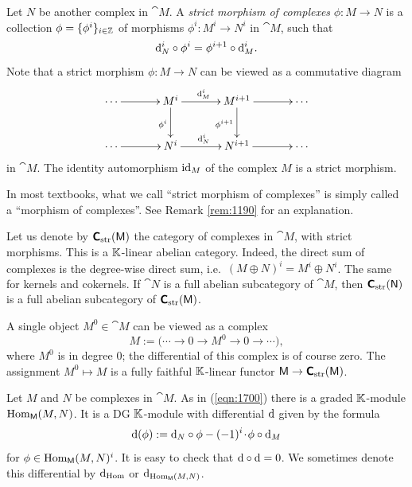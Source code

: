 Let $N$ be another complex in $\cat{M}$. A {\em strict morphism of complexes} 
$\phi : M \to N$ is a collection 
$\phi = \{ \phi^i \}_{i \in \mathbb{Z}}$ of morphisms $\phi^i : M^i \to N^i$ in
$\cat{M}$, such that
\begin{equation} \label{eqn:1254}
\mathrm{d}^i_N \circ \phi^i = \phi^{i+1} \circ \mathrm{d}^i_M .
\end{equation}
Note that a strict morphism $\phi : M \to N$ can be viewed as a commutative 
diagram 
\[ \UseTips  \xymatrix @C=8ex @R=6ex {
\cdots 
\ar[r]
&
M^i
\ar[r]^{\d_M^i}
\ar[d]_{\phi^i}
&
M^{i+1}
\ar[r]
\ar[d]_{\phi^{i+1}}
&
\cdots
\\
\cdots 
\ar[r]
&
N^i
\ar[r]^{\d_N^i}
&
N^{i+1}
\ar[r]
&
\cdots
} \]
in $\cat{M}$. 
The identity automorphism $\operatorname{id}_M$ of the complex $M$ is a strict 
morphism.  

\begin{rem} \label{rem:1210}
In most textbooks, what we call ``strict morphism of complexes'' is simply 
called a ``morphism of complexes''. See Remark \ref{rem:1190} for an 
explanation. 
\end{rem}

Let us denote by 
$\boldsymbol{\mathsf{C}}_{\mathrm{str}}(\operatorname{\mathsf{M}})$%
the category of complexes in 
$\cat{M}$, with strict morphisms. This is a $\mathbb{K}$-linear abelian category. 
Indeed, the direct sum of complexes is the degree-wise direct sum, i.e.\ 
$(M \oplus N)^i = M^i \oplus N^i$.
The same for kernels and cokernels.
If  $\cat{N}$ is a full abelian subcategory of $\cat{M}$, then  
$\boldsymbol{\mathsf{C}}_{\mathrm{str}}(\operatorname{\mathsf{N}})$ is a full abelian subcategory of 
$\boldsymbol{\mathsf{C}}_{\mathrm{str}}(\operatorname{\mathsf{M}})$.

A single object $M^0 \in \cat{M}$ can be viewed as a complex 
\[ M :=  \bigl( \cdots \to 0 \to M^0 \to 0 \to \cdots \bigr) , \] 
where $M^0$ is in degree $0$; the differential of this complex is of course 
zero. The assignment $M^0 \mapsto M$ is a fully faithful $\mathbb{K}$-linear functor 
$\operatorname{\mathsf{M}} \to \boldsymbol{\mathsf{C}}_{\mathrm{str}}(\operatorname{\mathsf{M}})$.

Let $M$ and $N$ be complexes in $\cat{M}$. As in (\ref{eqn:1700}) there is a 
graded $\mathbb{K}$-module $\operatorname{Hom}_{\operatorname{\mathsf{M}}}(M, N)$. It is a DG $\mathbb{K}$-module with 
differential $\mathrm{d}$ given by the formula 
\begin{equation} \label{eqn:1130}
\mathrm{d}(\phi) := \mathrm{d}_N \circ \phi - (-1)^i \mspace{1.5mu}{\cdot}\mspace{1.5mu} \phi \circ \mathrm{d}_M 
\end{equation}
for $\phi \in \operatorname{Hom}_{\operatorname{\mathsf{M}}}(M, N)^i$. 
It is easy to check that $\mathrm{d} \circ \mathrm{d} = 0$. 
We sometimes denote this differential by
$\mathrm{d}_{\operatorname{Hom}}$ or $\mathrm{d}_{\operatorname{Hom}_{\operatorname{\mathsf{M}}}(M, N)}$.

